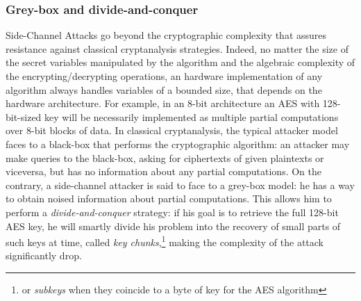 \subsubsection{Grey-box and divide-and-conquer}
Side-Channel Attacks go beyond the cryptographic complexity that assures resistance against classical cryptanalysis strategies.  Indeed, no matter the size of the secret variables manipulated by the algorithm and the algebraic complexity of the encrypting/decrypting operations, an hardware implementation of any algorithm always handles variables of a bounded size, that depends on the hardware architecture. For example, in an 8-bit architecture an AES with 128-bit-sized key will be necessarily implemented as multiple partial computations over 8-bit blocks of data. In classical cryptanalysis, the typical attacker model faces to a black-box that performs the cryptographic algorithm: an attacker may make queries to the black-box, asking for ciphertexts of given plaintexts or viceversa, but has no information about any partial computations. On the contrary, a side-channel attacker is said to face to a grey-box model: he has a way to obtain noised information about partial computations. This allows him to perform a \emph{divide-and-conquer} strategy: if his goal is to retrieve the full 128-bit AES key, he will smartly divide his problem into the recovery of small parts of such keys at time, called \emph{key chunks},\footnote{or \emph{subkeys} when they coincide to a byte of key for the AES algorithm} making the complexity of the attack significantly drop. 



